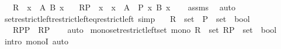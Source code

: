 \begin{isabellebody}
\ \ \ {\isachardoublequoteopen}R\ {\isasymsubseteq}\ {\isasymSum}x\ {\isasymin}\ A{\isachardot}{\kern0pt}\ B\ x{\isachardoublequoteclose}\isanewline
\ \ \ {\isachardoublequoteopen}R{\isasymrestriction}\isactrlbsub P\isactrlesub \ {\isasymsubseteq}\ {\isasymSum}x\ {\isasymin}\ {\isacharbraceleft}{\kern0pt}x\ {\isasymin}\ A\ {\isacharbar}{\kern0pt}\ P\ x{\isacharbraceright}{\kern0pt}{\isachardot}{\kern0pt}\ B\ x{\isachardoublequoteclose}\isanewline
%
\isadelimproof
\ \ %
\endisadelimproof
%
\isatagproof
{}\isamarkupfalse%
\ assms\ \isamarkupfalse%
\ auto%
\endisatagproof
{\isafoldproof}%
%
\isadelimproof
\isanewline
%
\endisadelimproof
\isanewline
{}\isamarkupfalse%
\ set{\isacharunderscore}{\kern0pt}restrict{\isacharunderscore}{\kern0pt}left{\isacharunderscore}{\kern0pt}restrict{\isacharunderscore}{\kern0pt}left{\isacharunderscore}{\kern0pt}eq{\isacharunderscore}{\kern0pt}restrict{\isacharunderscore}{\kern0pt}left\ {\isacharbrackleft}{\kern0pt}simp{\isacharbrackright}{\kern0pt}{\isacharcolon}{\kern0pt}\isanewline
\ \ \ R\ {\isacharcolon}{\kern0pt}{\isacharcolon}{\kern0pt}\ set\ \ P\ {\isacharcolon}{\kern0pt}{\isacharcolon}{\kern0pt}\ {\isachardoublequoteopen}set\ {\isasymRightarrow}\ bool{\isachardoublequoteclose}\isanewline
\ \ \ {\isachardoublequoteopen}{\isacharparenleft}{\kern0pt}R{\isasymrestriction}\isactrlbsub P\isactrlesub {\isacharparenright}{\kern0pt}{\isasymrestriction}\isactrlbsub P\isactrlesub \ {\isacharequal}{\kern0pt}\ R{\isasymrestriction}\isactrlbsub P\isactrlesub {\isachardoublequoteclose}\isanewline
%
\isadelimproof
\ \ %
\endisadelimproof
%
\isatagproof
{}\isamarkupfalse%
\ auto%
\endisatagproof
{\isafoldproof}%
%
\isadelimproof
\isanewline
%
\endisadelimproof
\isanewline
{}\isamarkupfalse%
\ mono{\isacharunderscore}{\kern0pt}set{\isacharunderscore}{\kern0pt}restrict{\isacharunderscore}{\kern0pt}left{\isacharunderscore}{\kern0pt}set{\isacharcolon}{\kern0pt}\ {\isachardoublequoteopen}mono\ {\isacharparenleft}{\kern0pt}{\isasymlambda}R\ {\isacharcolon}{\kern0pt}{\isacharcolon}{\kern0pt}\ set{\isachardot}{\kern0pt}\ R{\isasymrestriction}\isactrlbsub P\ {\isacharcolon}{\kern0pt}{\isacharcolon}{\kern0pt}\ set\ {\isasymRightarrow}\ bool\isactrlesub {\isacharparenright}{\kern0pt}{\isachardoublequoteclose}\isanewline
%
\isadelimproof
\ \ %
\endisadelimproof
%
\isatagproof
{}\isamarkupfalse%
\ {\isacharparenleft}{\kern0pt}intro\ monoI{\isacharparenright}{\kern0pt}\ auto%

\end{isabellebody}
